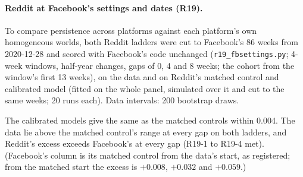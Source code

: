 \documentclass[10pt]{article}
\begin{document}
\paragraph{Reddit at Facebook's settings and dates (R19).} To compare persistence across platforms against each platform's own homogeneous worlds, both Reddit ladders were cut to Facebook's 86 weeks from 2020-12-28 and scored with Facebook's code unchanged (\texttt{r19\_fbsettings.py}; 4-week windows, half-year changes, gaps of 0, 4 and 8 weeks; the cohort from the window's first 13 weeks), on the data and on Reddit's matched control and calibrated model (fitted on the whole panel, simulated over it and cut to the same weeks; 20 runs each). Data intervals: 200 bootstrap draws.
\begin{center}\footnotesize{}\end{center}
The calibrated models give the same as the matched controls within 0.004. The data lie above the matched control's range at every gap on both ladders, and Reddit's excess exceeds Facebook's at every gap (R19-1 to R19-4 met). (Facebook's column is its matched control from the data's start, as registered; from the matched start the excess is $+0.008$, $+0.032$ and $+0.059$.)
\end{document}
